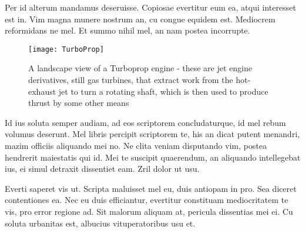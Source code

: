 Per id alterum mandamus deseruisse. Copiosae evertitur eum ea, atqui 
interesset est in. Vim magna munere nostrum an, cu congue equidem est. 
Mediocrem reformidans ne mel. Et summo nihil mel, an nam postea incorrupte.

\begin{landscape}
  \begin{figure}[hbt]
    \begin{center}
      \texttt{[image: TurboProp]}
    \end{center}
    \vspace{0.10in}
    \caption{A landscape view of a Turboprop engine - these are 
      jet engine derivatives, still gas turbines, that extract 
      work from the hot-exhaust jet to turn a rotating shaft, 
      which is then used to produce thrust by some other means}
    \label{CHAPTER3_FIG03}
  \end{figure}
\end{landscape}

Id ius soluta semper audiam, ad eos scriptorem concludaturque, id mel rebum 
volumus deserunt. Mel libris percipit scriptorem te, his an dicat putent 
menandri, mazim officiis aliquando mei no. Ne clita veniam disputando vim, 
postea hendrerit maiestatis qui id. Mei te suscipit quaerendum, an aliquando 
intellegebat ius, ei simul detraxit dissentiet eam. Zril dolor ut usu.

Everti saperet vis ut. Scripta maluisset mel eu, duis antiopam in pro. Sea 
diceret contentiones ea. Nec eu duis efficiantur, evertitur constituam 
mediocritatem te vis, pro error regione ad. Sit malorum aliquam at, pericula 
dissentias mei ei. Cu soluta urbanitas est, albucius vituperatoribus usu et.
